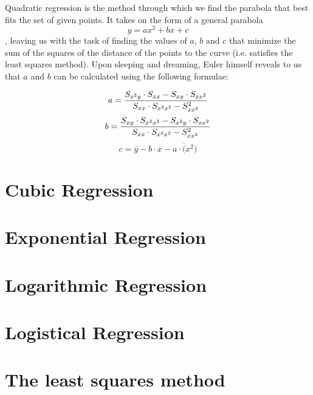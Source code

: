 \documentclass{article}
\begin{document}
		Quadratic regression is the method through which we find the parabola that best fits the set of given points. It takes on the form of a general parabola \[y = ax^{2} + bx + c\], leaving us with the task of finding the values of \(a\), \(b\) and \(c\) that minimize the sum of the squares of the distance of the points to the curve (i.e. satisfies the least squares method).  Upon sleeping and dreaming, Euler himself reveals to us that \(a\) and \(b\) can be calculated using the following formulae:

			\begin{equation}
				a = \frac{S_{x^{2}y} \cdot S_{xx} - S_{xy} \cdot S_{xx^{2}}}{S_{xx}\cdot S_{x^{2}x^{2}} - S_{xx^{2}}^{2}} \\
			\end{equation}
			\begin{equation}
				b = \frac{S_{xy} \cdot S_{x^{2}x^{2}} - S_{x^{2}y} \cdot S_{xx^{2}}}{S_{xx}\cdot S_{x^{2}x^{2}} - S_{xx^{2}}^{2}} \\
			\end{equation}
			\begin{equation}
				c = \overline{y} - b\cdot \overline{x} - a \cdot \overline(x^{2})
			\end{equation}
		
		
	\section{Cubic Regression}
	\section{Exponential Regression}
	\section{Logarithmic Regression}
	\section{Logistical Regression}
	\section*{The least squares method}
\end{document}
